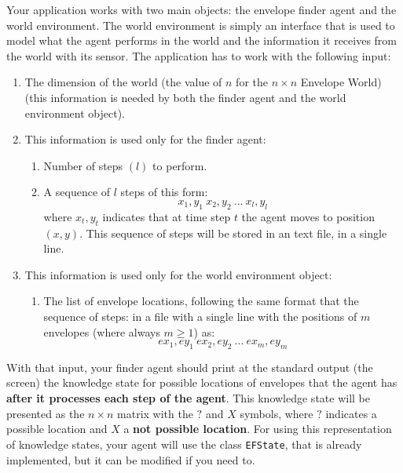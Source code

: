 \documentclass{tufte-handout}
\begin{document}
\begin{fullwidth}
Your application works with two main objects: the envelope finder agent and the world environment.
The world environment is simply an interface that is used to model what the agent performs in the
world and the information it receives from the world with its sensor.
The application has to work with the following input:
\begin{enumerate}
\item The dimension of the world (the value of $n$ for the
$n\times n$ Envelope World) (this information is needed by both
the finder agent and the world environment object).
\item This information is used only for the finder agent:
\begin{enumerate}
\item Number of steps $(l)$ to perform.
\item A sequence of $l$ steps of this form:
$$
 x_1,y_1 \ x_2,y_2 \ ... \ x_l,y_l
$$
where $ x_t,y_t $ indicates that at time step $t$ the agent moves
 to position $(x,y)$.
This sequence of steps will be stored in an text file, in a single line.
\end{enumerate}
\item This information is used only for the  world environment object:
\begin{enumerate}
\item The list of envelope locations, following the same format that the sequence
of steps: in a file with a single line with the positions of $m$ envelopes (where always
$m \geq 1$) as:
$$
 ex_1,ey_1 \ ex_2,ey_2 \ ... \ ex_m,ey_m
$$
\end{enumerate}
\end{enumerate}




With that input, your finder agent should print at the standard output
 (the screen)
the knowledge state for possible locations of envelopes that the agent
has {\bf after it processes each step of the agent}.
This knowledge state will be presented as the $n \times n$
matrix with the $?$ and $X$ symbols, where $?$ indicates a possible location
and $X$ a {\bf not possible location}. For using this representation of knowledge states, your
agent will use the class {\tt EFState}, that is already implemented, but it can
be modified if you need to.


\end{fullwidth}
\end{document}
